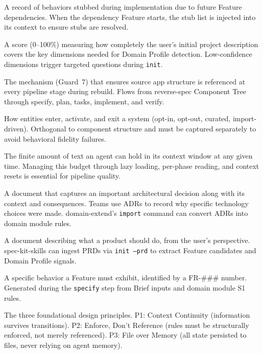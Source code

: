 \documentclass[11pt,a4paper,openright,twoside]{report}
\begin{document}
\begin{description}[style=nextline]
  \item[Stub Registry] A record of behaviors stubbed during implementation due to future Feature dependencies. When the dependency Feature starts, the stub list is injected into its context to ensure stubs are resolved.

  \item[Clarity Index] A score (0--100\%) measuring how completely the user's initial project description covers the key dimensions needed for Domain Profile detection. Low-confidence dimensions trigger targeted questions during \texttt{init}.

  \item[Fidelity Chain] The mechanism (Guard~7) that ensures source app structure is referenced at every pipeline stage during rebuild. Flows from reverse-spec Component Tree through specify, plan, tasks, implement, and verify.

  \item[Data Lifecycle Paradigm] How entities enter, activate, and exit a system (opt-in, opt-out, curated, import-driven). Orthogonal to component structure and must be captured separately to avoid behavioral fidelity failures.

  \item[Context Budget] The finite amount of text an agent can hold in its context window at any given time. Managing this budget through lazy loading, per-phase reading, and context resets is essential for pipeline quality.

  \item[ADR (Architecture Decision Record)] A document that captures an important architectural decision along with its context and consequences. Teams use ADRs to record why specific technology choices were made. domain-extend's \texttt{import} command can convert ADRs into domain module rules.

  \item[PRD (Product Requirements Document)] A document describing what a product should do, from the user's perspective. spec-kit-skills can ingest PRDs via \texttt{init --prd} to extract Feature candidates and Domain Profile signals.

  \item[FR (Functional Requirement)] A specific behavior a Feature must exhibit, identified by a FR-\#\#\# number. Generated during the \texttt{specify} step from Brief inputs and domain module S1 rules.

  \item[P1, P2, P3] The three foundational design principles. P1: Context Continuity (information survives transitions). P2: Enforce, Don't Reference (rules must be structurally enforced, not merely referenced). P3: File over Memory (all state persisted to files, never relying on agent memory).


\end{description}
\end{document}

